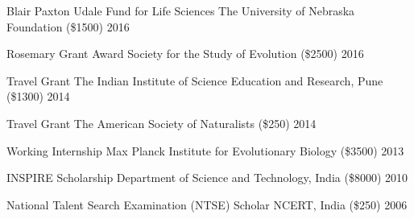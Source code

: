 \begin{cvhonors}
  \cvhonor
    {Blair Paxton Udale Fund for Life Sciences}
    {The University of Nebraska Foundation (\$1500)}
    {2016}

  \cvhonor
    {Rosemary Grant Award}
    {Society for the Study of Evolution (\$2500)}
    {2016}

  \cvhonor
    {Travel Grant}
    {The Indian Institute of Science Education and Research, Pune (\$1300)}
    {2014}

  \cvhonor
    {Travel Grant}
    {The American Society of Naturalists (\$250)}
    {2014}

  \cvhonor
    {Working Internship}
    {Max Planck Institute for Evolutionary Biology (\$3500)}
    {2013}

  \cvhonor
    {INSPIRE Scholarship}
    {Department of Science and Technology, India (\$8000)}
    {2010}

  \cvhonor
    {National Talent Search Examination (NTSE) Scholar}
    {NCERT, India (\$250)}
    {2006}
 
\end{cvhonors}

